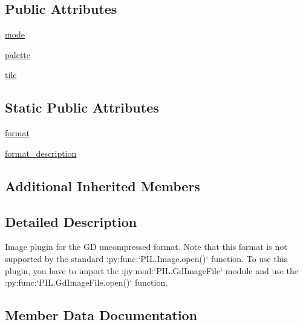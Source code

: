 \subsection*{Public Attributes}
\begin{DoxyCompactItemize}
\item 
\hyperlink{classPIL_1_1GdImageFile_1_1GdImageFile_ad0369d26536381a004af2f5ed4bffc1c}{mode}
\item 
\hyperlink{classPIL_1_1GdImageFile_1_1GdImageFile_a573d5e92dbf378d1eaa37db706ba527c}{palette}
\item 
\hyperlink{classPIL_1_1GdImageFile_1_1GdImageFile_a6caf3ac328755cc72105622e773b20a7}{tile}
\end{DoxyCompactItemize}
\subsection*{Static Public Attributes}
\begin{DoxyCompactItemize}
\item 
\hyperlink{classPIL_1_1GdImageFile_1_1GdImageFile_a705f0218d05ab57b012e5d0afd470c01}{format}
\item 
\hyperlink{classPIL_1_1GdImageFile_1_1GdImageFile_a44e000fd390f9193a55b947bd97f91e8}{format\+\_\+description}
\end{DoxyCompactItemize}
\subsection*{Additional Inherited Members}


\subsection{Detailed Description}
\begin{DoxyVerb}Image plugin for the GD uncompressed format.  Note that this format
is not supported by the standard :py:func:`PIL.Image.open()` function.  To use
this plugin, you have to import the :py:mod:`PIL.GdImageFile` module and
use the :py:func:`PIL.GdImageFile.open()` function.
\end{DoxyVerb}
 

\subsection{Member Data Documentation}
\mbox{\label{classPIL_1_1GdImageFile_1_1GdImageFile_a705f0218d05ab57b012e5d0afd470c01}} 
